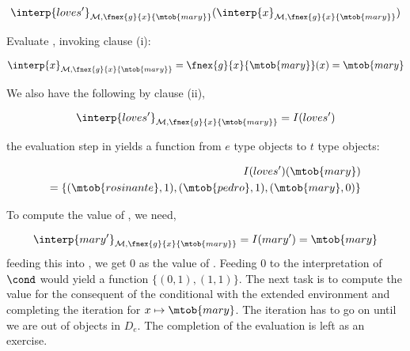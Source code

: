 \documentclass[11pt,a4paper,draft]{article}
\begin{document}
\begin{align}\label{lovesx}
\interp{loves'}_{\mathcal{M},\fnex{g}{x}{\mtob{mary}}} (\interp{x}_{\mathcal{M},\fnex{g}{x}{\mtob{mary}}})
\end{align}

Evaluate , invoking clause (i):

\begin{align}
\interp{x}_{\mathcal{M},\fnex{g}{x}{\mtob{mary}}} = \fnex{g}{x}{\mtob{mary}}(x) = \mtob{mary}
\end{align}

We also have the following by clause (ii),

\begin{align}
\interp{loves'}_{\mathcal{M},\fnex{g}{x}{\mtob{mary}}} = I(loves')
\end{align}

the evaluation step in  yields a function from $e$ type objects to $t$ type objects:

\begin{align}\label{lovesxval}
I(loves') (\mtob{mary}) \\
= \{(\mtob{rosinante}, 1), (\mtob{pedro}, 1), (\mtob{mary}, 0)\} 
\end{align}

To compute the value of , we need,

\begin{align}
\interp{mary'}_{\mathcal{M},\fnex{g}{x}{\mtob{mary}}} = I(mary') = \mtob{mary}
\end{align}
feeding this into , we get 0 as the value of . Feeding 0 to the interpretation of $\cond$ would yield a function $\{(0,1), (1,1)\}$. The next task is to compute the value for the consequent of the conditional with the extended environment and completing the iteration for $x\mapsto \mtob{mary}$. The iteration has to go on until we are out of objects in $D_e$. The completion of the evaluation is left as an exercise.

%
\end{document}
